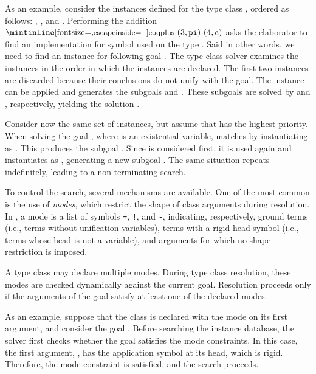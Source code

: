 As an example, consider the instances defined for the type class
, ordered as follows: , , and
. Performing the addition $\cI{plus}\ (3, \pi)\ (4, e)$
asks the elaborator to find an implementation for symbol 
used on the type . Said in other words,
we need to find an instance for following goal .
The type-class solver examines
the instances in the order in which the instances are declared. The first 
two instances are discarded
because their conclusions do not unify with the goal. The instance
 can be applied and generates the subgoals  and
. These subgoals are solved by  and ,
respectively, yielding the solution
.

Consider now
the same set of instances, but assume that  has the highest
priority. When solving the goal , where  is an
existential variable,  matches by instantiating  as
. This produces the subgoal . Since
 is considered first, it is used again and instantiates
 as , generating a new subgoal . The
same situation repeats indefinitely, leading to a non-terminating search. 

To control the search, several mechanisms are available. One of the most common
is the use of \emph{modes}, which restrict the shape of class arguments during
resolution. In \rocq{}, a mode is a list of symbols \texttt{+}, \texttt{!}, and
\texttt{-}, indicating, respectively, ground terms (i.e., terms without
unification variables), terms with a rigid head symbol (i.e., terms whose head
is not a variable), and arguments for which no shape restriction is imposed.

A type class may declare multiple modes. During type class resolution, these
modes are checked dynamically against the current goal. Resolution proceeds only
if the arguments of the goal satisfy at least one of the declared modes.

As an example, suppose that the class  is declared with the mode \cI{!}
on its first argument, and consider the goal . Before
searching the instance database, the solver first checks whether the goal
satisfies the mode constraints. In this case, the first argument, ,
has the application symbol \cI{*} at its head, which is rigid. Therefore, the
mode constraint is satisfied, and the search proceeds.

